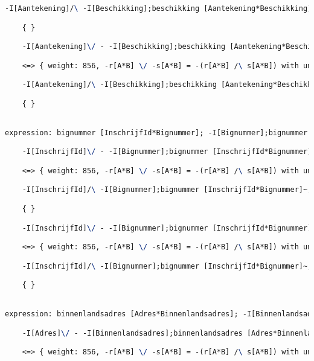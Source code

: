 \begin{lstlisting}[language=TeX]
    -I[Aantekening]/\ -I[Beschikking];beschikking [Aantekening*Beschikking]~;beschikking [Aantekening*Beschikking]

    { }

    -I[Aantekening]\/ - -I[Beschikking];beschikking [Aantekening*Beschikking]~;beschikking [Aantekening*Beschikking]

    <=> { weight: 856, -r[A*B] \/ -s[A*B] = -(r[A*B] /\ s[A*B]) with unifier: {A->I[Aantekening], B->I[Aantekening], r->I[Aantekening], s->beschikking [Aantekening*Beschikking];-I[Beschikking];beschikking [Aantekening*Beschikking]~} }

    -I[Aantekening]/\ -I[Beschikking];beschikking [Aantekening*Beschikking]~;beschikking [Aantekening*Beschikking]

    { }


expression: bignummer [InschrijfId*Bignummer]; -I[Bignummer];bignummer [InschrijfId*Bignummer]~ |- -I[InschrijfId]

    -I[InschrijfId]\/ - -I[Bignummer];bignummer [InschrijfId*Bignummer]~;bignummer [InschrijfId*Bignummer]

    <=> { weight: 856, -r[A*B] \/ -s[A*B] = -(r[A*B] /\ s[A*B]) with unifier: {A->I[InschrijfId], B->I[InschrijfId], r->bignummer [InschrijfId*Bignummer];-I[Bignummer];bignummer [InschrijfId*Bignummer]~, s->I[InschrijfId]} }

    -I[InschrijfId]/\ -I[Bignummer];bignummer [InschrijfId*Bignummer]~;bignummer [InschrijfId*Bignummer]

    { }

    -I[InschrijfId]\/ - -I[Bignummer];bignummer [InschrijfId*Bignummer]~;bignummer [InschrijfId*Bignummer]

    <=> { weight: 856, -r[A*B] \/ -s[A*B] = -(r[A*B] /\ s[A*B]) with unifier: {A->I[InschrijfId], B->I[InschrijfId], r->I[InschrijfId], s->bignummer [InschrijfId*Bignummer];-I[Bignummer];bignummer [InschrijfId*Bignummer]~} }

    -I[InschrijfId]/\ -I[Bignummer];bignummer [InschrijfId*Bignummer]~;bignummer [InschrijfId*Bignummer]

    { }


expression: binnenlandsadres [Adres*Binnenlandsadres]; -I[Binnenlandsadres];binnenlandsadres [Adres*Binnenlandsadres]~ |- -I[Adres]

    -I[Adres]\/ - -I[Binnenlandsadres];binnenlandsadres [Adres*Binnenlandsadres]~;binnenlandsadres [Adres*Binnenlandsadres]

    <=> { weight: 856, -r[A*B] \/ -s[A*B] = -(r[A*B] /\ s[A*B]) with unifier: {A->I[Adres], B->I[Adres], r->binnenlandsadres [Adres*Binnenlandsadres];-I[Binnenlandsadres];binnenlandsadres [Adres*Binnenlandsadres]~, s->I[Adres]} }


\end{lstlisting}
